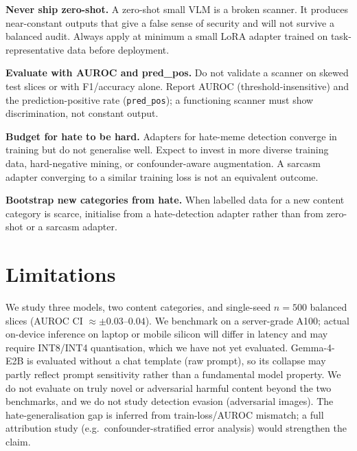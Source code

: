 \documentclass[sigconf,nonacm]{acmart}
\begin{document}
\noindent\textbf{Never ship zero-shot.} A zero-shot small VLM is a broken scanner. It
produces near-constant outputs that give a false sense of security and will not survive
a balanced audit. Always apply at minimum a small LoRA adapter trained on task-representative
data before deployment.

\noindent\textbf{Evaluate with AUROC and pred\_pos.} Do not validate a scanner on
skewed test slices or with F1/accuracy alone. Report AUROC (threshold-insensitive) and the
prediction-positive rate (\texttt{pred\_pos}); a functioning scanner must show
discrimination, not constant output.

\noindent\textbf{Budget for hate to be hard.} Adapters for hate-meme detection converge in
training but do not generalise well. Expect to invest in more diverse training data,
hard-negative mining, or confounder-aware augmentation. A sarcasm adapter converging to a
similar training loss is not an equivalent outcome.

\noindent\textbf{Bootstrap new categories from hate.} When labelled data for a new content
category is scarce, initialise from a hate-detection adapter rather than from zero-shot or
a sarcasm adapter.

\section{Limitations}
We study three models, two content categories, and single-seed $n{=}500$ balanced slices
(AUROC CI $\approx\pm0.03$--$0.04$). We benchmark on a server-grade A100; actual on-device
inference on laptop or mobile silicon will differ in latency and may require INT8/INT4
quantisation, which we have not yet evaluated. Gemma-4-E2B is evaluated without a chat
template (raw prompt), so its collapse may partly reflect prompt sensitivity rather than a
fundamental model property. We do not evaluate on truly novel or adversarial harmful
content beyond the two benchmarks, and we do not study detection evasion (adversarial
images). The hate-generalisation gap is inferred from train-loss/AUROC mismatch; a
full attribution study (e.g.\ confounder-stratified error analysis) would strengthen the
claim.

\end{document}
